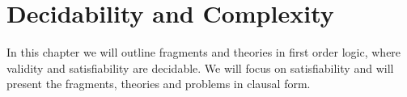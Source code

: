 
\chapter{Decidability and Complexity}



In this chapter we will outline fragments and theories in first order logic, 
where validity and satisfiability are decidable. 
We will focus on satisfiability and will present the fragments, theories and problems in clausal form.





